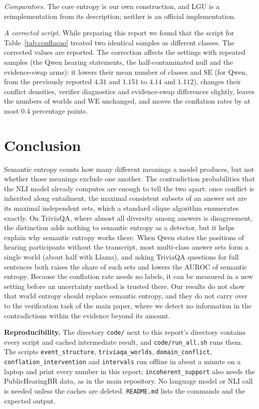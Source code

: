 \documentclass[english]{desafiokunumi}
\theoremstyle{definition}
\theoremstyle{remark}
\newcommand{\SE}{\mathrm{SE}}
\newcommand{\WE}{\mathrm{WE}}
\begin{document}
\emph{Comparators.} The core entropy is our own construction, and LGU is a
reimplementation from its description; neither is an official
implementation.

\emph{A corrected script.} While preparing this report we found that the
script for Table~\ref{tab:conflacao} treated two identical samples as
different classes. The corrected values are reported. The correction affects
the settings with repeated samples (the Qwen hearing statements, the
half-contaminated null and the evidence-swap arms): it lowers their mean
number of classes and $\SE$ (for Qwen, from the previously reported $4.31$ and
$1.151$ to $4.14$ and $1.112$), changes their conflict densities, verifier
diagnostics and evidence-swap differences slightly, leaves the numbers of
worlds and $\WE$ unchanged, and moves the conflation rates by at most $0.4$
percentage points.

\section{Conclusion}
\label{sec:conc}

Semantic entropy counts how many different meanings a model produces, but not
whether those meanings exclude one another. The contradiction probabilities
that the NLI model already computes are enough to tell the two apart: once
conflict is inherited along entailment, the maximal consistent subsets of an
answer set are its maximal independent sets, which a standard clique algorithm
enumerates exactly. On TriviaQA, where almost all diversity among answers is
disagreement, the distinction adds nothing to semantic entropy as a detector,
but it helps explain why semantic entropy works there. When Qwen states the
positions of hearing participants without the transcript, most multi-class
answer sets form a single world (about half with Llama), and asking TriviaQA
questions for full sentences both raises the share of such sets and lowers
the AUROC of semantic entropy. Because the conflation rate needs no labels, it can be
measured in a new setting before an uncertainty method is trusted there. Our
results do not show that world entropy should replace semantic entropy, and
they do not carry over to the verification task of the main paper, where we
detect no information in the contradictions within the evidence beyond its
amount.

\medskip\noindent\textbf{Reproducibility.} The directory \texttt{code/}
next to this report's directory contains every script and cached intermediate
result, and \texttt{code/run\_all.sh} runs them. The scripts
\texttt{event\_structure}, \texttt{triviaqa\_worlds}, \texttt{domain\_conflict},
\texttt{conflation\_intervention} and \texttt{intervals} run offline in about a
minute on a laptop and print every number in this report;
\texttt{incoherent\_support} also needs the PublicHearingBR data, as in the main
repository. No language model or NLI call is needed unless the caches are
deleted. \texttt{README.md} lists the commands and the expected output.

\begingroup
\footnotesize
\setlength{\bibsep}{0pt plus 0.2ex}

\endgroup
\end{document}
